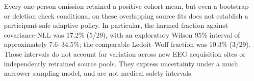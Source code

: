 Every one-person omission retained a positive cohort mean,
but even a bootstrap or deletion check conditional on these
overlapping source fits does not establish a participant-safe
adaptive policy. In particular, the harmed fraction against
covariance-NLL was 17.2\% (5/29), with an exploratory Wilson
95\% interval of approximately 7.6--34.5\%;
the comparable Ledoit--Wolf fraction was 10.3\% (3/29).
Those intervals do not account for variation across new
EEG acquisition sites or independently retrained source pools.
They express uncertainty under a much narrower sampling
model, and are not medical safety intervals.


